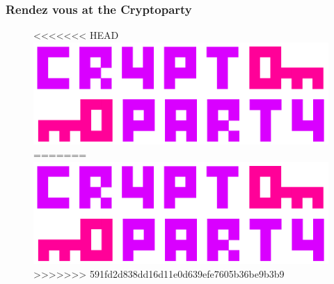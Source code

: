 \documentclass{beamer}
\begin{document}
\begin{frame}
\frametitle{Rendez vous at the Cryptoparty}
\begin{figure}
<<<<<<< HEAD
\includegraphics[width=0.8\linewidth]{./materials/cryptoparty.jpg}
=======
\includegraphics[width=0.8\linewidth]{./materials/cryptoparty}
>>>>>>> 591fd2d838dd16d11e0d639efe7605b36be9b3b9
\end{figure}
\end{frame}
\end{document}
